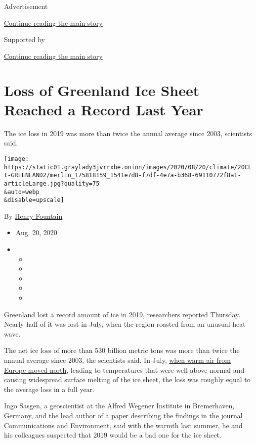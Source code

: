 Advertisement

\protect\hyperlink{after-top}{Continue reading the main story}

Supported by

\protect\hyperlink{after-sponsor}{Continue reading the main story}

\hypertarget{loss-of-greenland-ice-sheet-reached-a-record-last-year}{%
\section{Loss of Greenland Ice Sheet Reached a Record Last
Year}\label{loss-of-greenland-ice-sheet-reached-a-record-last-year}}

The ice loss in 2019 was more than twice the annual average since 2003,
scientists said.

\texttt{[image: https://static01.graylady3jvrrxbe.onion/images/2020/08/20/climate/20CLI-GREENLAND2/merlin\_175818159\_1541e7d8-f7df-4e7a-b368-69110772f8a1-articleLarge.jpg?quality=75\\\&auto=webp\\\&disable=upscale]}

By \href{https://www.nytimes3xbfgragh.onion/by/henry-fountain}{Henry
Fountain}

\begin{itemize}
\item
  Aug. 20, 2020
\item
  \begin{itemize}
  \item
  \item
  \item
  \item
  \item
  \end{itemize}
\end{itemize}

Greenland lost a record amount of ice in 2019, researchers reported
Thursday. Nearly half of it was lost in July, when the region roasted
from an unusual heat wave.

The net ice loss of more than 530 billion metric tons was more than
twice the annual average since 2003, the scientists said. In July,
\href{https://www.nytimes3xbfgragh.onion/2019/08/02/climate/european-heatwave-climate-change.html}{when
warm air from Europe moved north}, leading to temperatures that were
well above normal and causing widespread surface melting of the ice
sheet, the loss was roughly equal to the average loss in a full year.

Ingo Sasgen, a geoscientist at the Alfred Wegener Institute in
Bremerhaven, Germany, and the lead author of a paper
\href{https://www.nature.com/articles/s43247-020-0010-1}{describing the
findings} in the journal Communications and Environment, said with the
warmth last summer, he and his colleagues suspected that 2019 would be a
bad one for the ice sheet.

